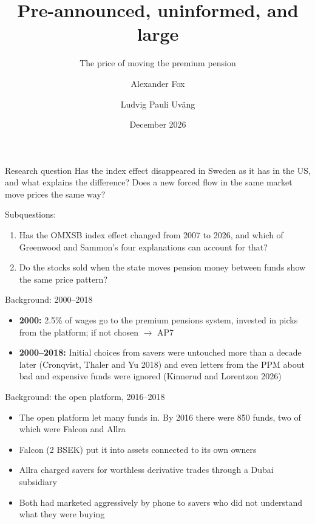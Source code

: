 \documentclass[aspectratio=169]{beamer}
\title[Finance Thesis Fall 26]{Pre-announced, uninformed, and large}
\subtitle{The price of moving the premium pension}
\author[Alexander Fox \& Ludvig P Uväng]{Alexander Fox \and Ludvig Pauli Uväng}
\institute{Stockholm School of Economics}
\date{December 2026}
\begin{document}
\maketitle

\begin{frame}[label=question]{Research question}
  Has the index effect disappeared in Sweden as it has in the US, and what
  explains the difference? Does a new forced flow in the same market move
  prices the same way?

  \bigskip
  Subquestions:
  \begin{enumerate}
    \item Has the OMXSB index effect changed from 2007 to 2026, and which of
      Greenwood and Sammon's four explanations can account for that?
    \item Do the stocks sold when the state moves pension money between funds
      show the same price pattern?
  \end{enumerate}
\end{frame}

\begin{frame}[label=setting]{Background: 2000--2018}
  \begin{itemize}
    \item \textbf{2000:} 2.5\% of wages go to the premium pensions system,
      invested in picks from the platform; if not chosen $\rightarrow$ AP7
    \item \textbf{2000--2018:} Initial choices from savers were untouched more than
      a decade later (Cronqvist, Thaler and Yu 2018) and even letters from the PPM
      about bad and expensive funds were ignored (Kinnerud and Lorentzon 2026)
  \end{itemize}
\end{frame}

\begin{frame}{Background: the open platform, 2016--2018}
  \begin{itemize}
    \item The open platform let many funds in. By 2016 there were 850 funds,
      two of which were Falcon and Allra
    \item Falcon (2 BSEK) put it into assets connected to its own owners
    \item Allra charged savers for worthless derivative trades through a Dubai subsidiary
    \item Both had marketed aggressively by phone to savers who did not understand
      what they were buying
  \end{itemize}
\end{frame}
\end{document}

